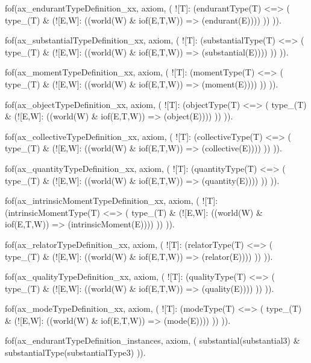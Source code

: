  


fof(ax_endurantTypeDefinition_xx, axiom, (
  ![T]: (endurantType(T) <=> (
    type_(T) & (![E,W]: ((world(W) & iof(E,T,W)) => (endurant(E))))
  ))
)).

fof(ax_substantialTypeDefinition_xx, axiom, (
  ![T]: (substantialType(T) <=> (
    type_(T) & (![E,W]: ((world(W) & iof(E,T,W)) => (substantial(E))))
  ))
)).

fof(ax_momentTypeDefinition_xx, axiom, (
  ![T]: (momentType(T) <=> (
    type_(T) & (![E,W]: ((world(W) & iof(E,T,W)) => (moment(E))))
  ))
)).

fof(ax_objectTypeDefinition_xx, axiom, (
  ![T]: (objectType(T) <=> (
    type_(T) & (![E,W]: ((world(W) & iof(E,T,W)) => (object(E))))
  ))
)).

fof(ax_collectiveTypeDefinition_xx, axiom, (
  ![T]: (collectiveType(T) <=> (
    type_(T) & (![E,W]: ((world(W) & iof(E,T,W)) => (collective(E))))
  ))
)).

fof(ax_quantityTypeDefinition_xx, axiom, (
  ![T]: (quantityType(T) <=> (
    type_(T) & (![E,W]: ((world(W) & iof(E,T,W)) => (quantity(E))))
  ))
)).

fof(ax_intrinsicMomentTypeDefinition_xx, axiom, (
  ![T]: (intrinsicMomentType(T) <=> (
    type_(T) & (![E,W]: ((world(W) & iof(E,T,W)) => (intrinsicMoment(E))))
  ))
)).

fof(ax_relatorTypeDefinition_xx, axiom, (
  ![T]: (relatorType(T) <=> (
    type_(T) & (![E,W]: ((world(W) & iof(E,T,W)) => (relator(E))))
  ))
)).

fof(ax_qualityTypeDefinition_xx, axiom, (
  ![T]: (qualityType(T) <=> (
    type_(T) & (![E,W]: ((world(W) & iof(E,T,W)) => (quality(E))))
  ))
)).

fof(ax_modeTypeDefinition_xx, axiom, (
  ![T]: (modeType(T) <=> (
    type_(T) & (![E,W]: ((world(W) & iof(E,T,W)) => (mode(E))))
  ))
)).

fof(ax_endurantTypeDefinition_instances, axiom, (
  substantial(substantial3) & substantialType(substantialType3)
)).

